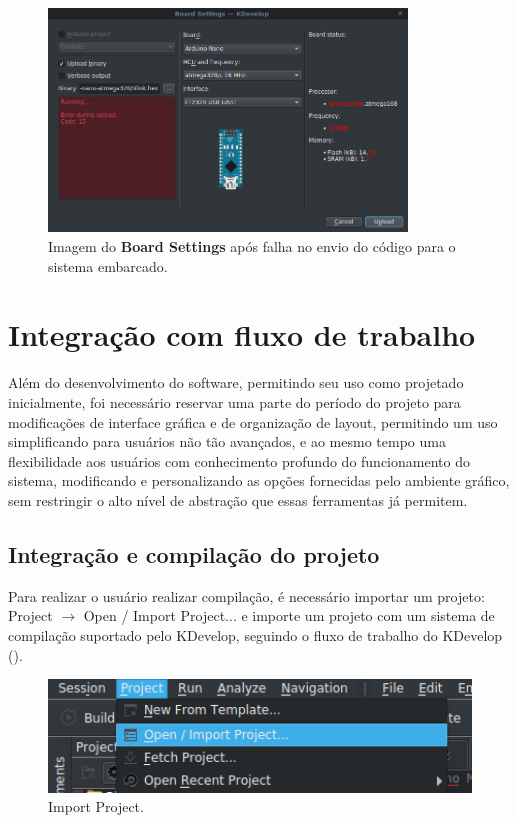 \begin{figure}[!htb]
  \centering
  \includegraphics[width=0.85\textwidth]{figuras/boardsettingsndone.png}
  \caption[Board Settings com falha no envio]{Imagem do \textbf{Board Settings} após falha no envio do código para o sistema embarcado.}
  \label{fig:boardsettingsndone}
\end{figure}

\section{Integração com fluxo de trabalho}
Além do desenvolvimento do software, permitindo seu uso como projetado inicialmente, foi necessário reservar uma parte do período do projeto para modificações de interface gráfica e de organização de layout, permitindo um uso simplificando para usuários não tão avançados, e ao mesmo tempo uma flexibilidade aos usuários com conhecimento profundo do funcionamento do sistema, modificando e personalizando as opções fornecidas pelo ambiente gráfico, sem restringir o alto nível de abstração que essas ferramentas já permitem.

\subsection{Integração e compilação do projeto}

Para realizar o usuário realizar compilação, é necessário importar um projeto: Project $\rightarrow$ Open / Import Project... e importe um projeto com um sistema de compilação suportado pelo KDevelop, seguindo o fluxo de trabalho do KDevelop ().

\begin{figure}[!htb]
  \centering
  \includegraphics[width=1\textwidth]{figuras/importproject.png}
  \caption[Import Project]{Import Project.}
  \label{fig:importproject}
\end{figure}

